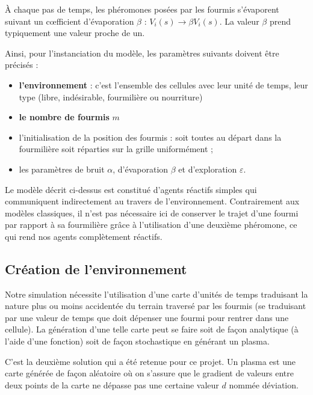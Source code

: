 \documentclass[a4]{article}
\begin{document}
À chaque pas de temps, les phéromones posées par les fourmis s'évaporent suivant un cœfficient d'évaporation $\beta$ :
$V_{i}(s) \rightarrow \beta V_{i}(s)$. La valeur $\beta$ prend typiquement une valeur proche de un. 

Ainsi, pour l'instanciation du modèle, les paramètres suivants doivent être précisés :
\begin{itemize}
\item \textbf{l'environnement} : c'est l'ensemble des cellules avec leur unité de temps, leur type (libre, indésirable, fourmilière ou nourriture)
\item \textbf{le nombre de fourmis} $m$
\item l'initialisation de la position des fourmis : soit toutes au départ dans la fourmilière soit réparties sur la grille uniformément ;
\item les paramètres de bruit $\alpha$, d'évaporation $\beta$ et d'exploration $\varepsilon$.
\end{itemize}

Le modèle décrit ci-dessus est constitué d'agents réactifs simples qui communiquent indirectement au travers de l'environnement. Contrairement aux modèles classiques, il n'est pas nécessaire ici de conserver le trajet d'une fourmi par rapport à sa fourmilière grâce à l'utilisation d'une deuxième phéromone, ce qui rend nos agents complètement réactifs.

\subsection{Création de l'environnement}

Notre simulation nécessite l'utilisation d'une carte d'unités de temps traduisant la nature plus ou moins accidentée du terrain traversé
par les fourmis (se traduisant par une valeur de temps que doit dépenser une fourmi pour rentrer dans une cellule). La génération d'une telle
carte peut se faire soit de façon analytique (à l'aide d'une fonction) soit de façon stochastique en générant un plasma.

C'est la deuxième solution qui a été retenue pour ce projet. Un plasma est une carte générée de façon aléatoire où on s'assure que
le gradient de valeurs entre deux points de la carte ne dépasse pas une certaine valeur $d$ nommée déviation.
\end{document}
